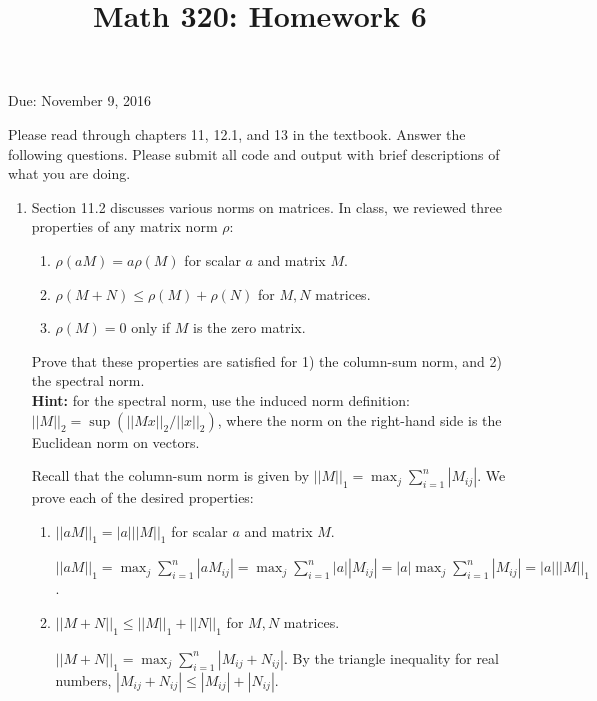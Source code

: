 \documentclass[12pt]{amsart}
\begin{document}
\title{Math 320: Homework 6}
Due: November 9, 2016
\maketitle

Please read through chapters 11, 12.1, and 13 in the textbook.
Answer the following questions. Please submit all code
and output with brief descriptions of what you are doing.

\vspace{5mm}

\begin{enumerate}

\item Section 11.2 discusses various norms on matrices.
In class, we reviewed three properties of any matrix norm $\rho$:
\begin{enumerate}
\item $\rho(a M) = a \rho(M)$ for scalar $a$ and matrix $M$.
\item $\rho( M + N) \leq \rho(M) + \rho(N)$ for $M,N$ matrices.
\item $\rho(M) = 0$ only if $M$ is the zero matrix.
\end{enumerate}
Prove that these properties are satisfied for 1) the column-sum
norm, and 2) the spectral norm. \\ 
{\bf Hint:} for the spectral norm,
use the induced norm definition: 
$||M||_2 = \sup(||Mx||_2 /||x||_2)$, where the
norm on the right-hand side is the Euclidean norm on vectors.

\vspace{5mm}

Recall that the column-sum norm is given by 
$||M||_1 = \max_{j} \sum_{i = 1}^n |M_{ij}|$. We prove
each of the desired properties:

\begin{enumerate}
\item $|| a M ||_1 = |a| || M||_{1}$ for scalar $a$ and matrix $M$.

$|| a M ||_1 = \max_{j} \sum_{i = 1}^n |aM_{ij}| = \max_{j} \sum_{i = 1}^n |a||M_{ij}| = |a| \max_{j} \sum_{i = 1}^n | M_{ij}| = |a| ||M||_{1}$.


\item $|| M + N ||_1 \leq ||M||_1 + ||N||_1$ for $M,N$ matrices.

$||M+N||_1 = \max_{j} \sum_{i = 1}^n | M_{ij} + N_{ij}|$. By the triangle
inequality for real numbers, $|M_{ij} + N_{ij}| \leq |M_{ij}| + |N_{ij}|$.


\end{enumerate}
\end{enumerate}
\end{document}
